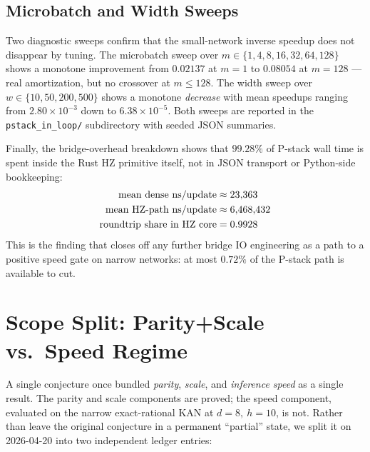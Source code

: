 \documentclass[11pt,a4paper]{article}
\begin{document}
\subsection{Microbatch and Width Sweeps}

Two diagnostic sweeps confirm that the small-network inverse speedup
does not disappear by tuning. The microbatch sweep over
$m \in \{1,4,8,16,32,64,128\}$ shows a monotone improvement from
$0.02137$ at $m=1$ to $0.08054$ at $m=128$ --- real amortization, but no
crossover at $m \leq 128$. The width sweep over
$w \in \{10,50,200,500\}$ shows a monotone \emph{decrease} with mean
speedups ranging from $2.80 \times 10^{-3}$ down to
$6.38 \times 10^{-5}$. Both sweeps are reported in the
\texttt{pstack\_in\_loop/} subdirectory with seeded JSON summaries.

Finally, the bridge-overhead breakdown shows that $99.28\%$ of P-stack
wall time is spent inside the Rust HZ primitive itself, not in JSON
transport or Python-side bookkeeping:
\begin{align}
\text{mean dense ns/update} &\approx 23{,}363 \notag \\
\text{mean HZ-path ns/update} &\approx 6{,}468{,}432 \notag \\
\text{roundtrip share in HZ core} &= 0.9928 \label{eq:bridge}
\end{align}
This is the finding that closes off any further bridge IO engineering
as a path to a positive speed gate on narrow networks: at most
$0.72\%$ of the P-stack path is available to cut.

\section{Scope Split: Parity+Scale vs.\ Speed Regime}
\label{sec:scope_split}

A single conjecture once bundled \emph{parity}, \emph{scale}, and
\emph{inference speed} as a single result. The parity and scale
components are proved; the speed component, evaluated on the narrow
exact-rational KAN at $d{=}8,\ h{=}10$, is not. Rather than leave the
original conjecture in a permanent ``partial'' state, we split it on
2026-04-20 into two independent ledger entries:
\end{document}
